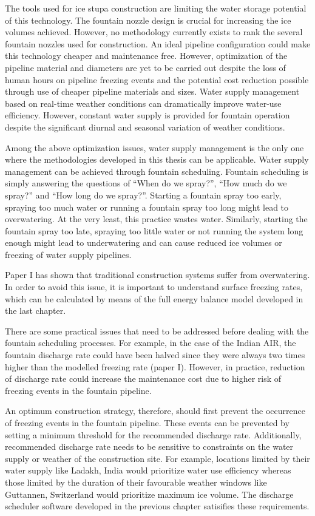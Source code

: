 The tools used for ice stupa construction are limiting the water storage potential of this technology. The
fountain nozzle design is crucial for increasing the ice volumes achieved. However, no methodology currently
exists to rank the several fountain nozzles used for construction. An ideal pipeline configuration could make
this technology cheaper and maintenance free. However, optimization of the pipeline material and diameters are
yet to be carried out despite the loss of human hours on pipeline freezing events and the potential cost
reduction possible through use of cheaper pipeline materials and sizes. Water supply management based on
real-time weather conditions can dramatically improve water-use efficiency. However, constant water supply is
provided for fountain operation despite the significant diurnal and seasonal variation of weather conditions.

Among the above optimization issues, water supply management is the only one where the methodologies developed
in this thesis can be applicable. Water supply management can be achieved through fountain scheduling. Fountain
scheduling is simply answering the questions of “When do we spray?”, “How much do we spray?” and “How long do we
spray?”. Starting a fountain spray too early, spraying too much water or running a fountain spray too long might
lead to overwatering. At the very least, this practice wastes water.  Similarly, starting the fountain spray too
late, spraying too little water or not running the system long enough might lead to underwatering and can cause
reduced ice volumes or freezing of water supply pipelines.

Paper I has shown that traditional construction systems suffer from overwatering. In order to avoid this issue,
it is important to understand surface freezing rates, which can be calculated by means of the full energy
balance model developed in the last chapter.

There are some practical issues that need to be addressed before dealing with the fountain scheduling processes.
For example, in the case of the Indian AIR, the fountain discharge rate could have been halved since they were
always two times higher than the modelled freezing rate (paper I). However, in practice, reduction of discharge
rate could increase the maintenance cost due to higher risk of freezing events in the fountain pipeline.

An optimum construction strategy, therefore, should first prevent the occurrence of freezing events in the
fountain pipeline. These events can be prevented by setting a minimum threshold for the recommended discharge
rate. Additionally, recommended discharge rate needs to be sensitive to constraints on the water supply or
weather of the construction site. For example, locations limited by their water supply like Ladakh, India
would prioritize water use efficiency whereas those limited by the duration of their favourable weather windows
like Guttannen, Switzerland would prioritize maximum ice volume. The discharge scheduler software developed in
the previous chapter satisifies these requirements.

